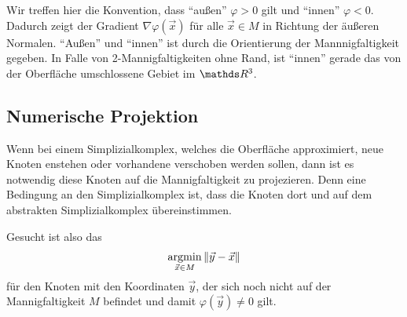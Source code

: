     Wir treffen hier die Konvention, dass "`außen"' \( \varphi > 0 \) gilt und "`innen"' \( \varphi < 0 \).
    Dadurch zeigt der Gradient \( \nabla\varphi(\vec{x}) \) für alle \( \vec{x}\in M \) in Richtung der äußeren Normalen.
    "`Außen"' und "`innen"' ist durch die Orientierung der Mannnigfaltigkeit gegeben. 
    In Falle von 2-Mannigfaltigkeiten ohne Rand, ist "`innen"' gerade das von der Oberfläche umschlossene Gebiet im \( \R^{3} \).

    \subsection{Numerische Projektion}
      \label{SubSubSecPhiProject}
      Wenn bei einem Simplizialkomplex, welches die Oberfläche approximiert, neue Knoten enstehen oder vorhandene verschoben werden sollen,
      dann ist es notwendig diese Knoten auf die Mannigfaltigkeit zu projezieren. 
      Denn eine Bedingung an den Simplizialkomplex ist, dass die Knoten dort und auf dem abstrakten Simplizialkomplex übereinstimmen.

      Gesucht ist also das
      \begin{align}
        \argmin_{\vec{x}\in M} \|\vec{y} - \vec{x}\|
      \end{align}
      für den Knoten mit den Koordinaten \( \vec{y} \), der sich noch nicht auf der Mannigfaltigkeit \( M \) befindet 
      und damit \( \varphi(\vec{y}) \neq 0 \) gilt.

